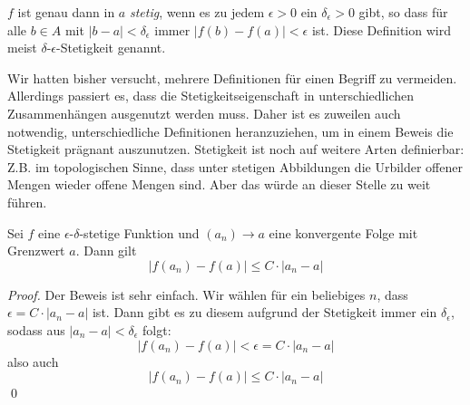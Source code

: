 \begin{definition}
$f$ ist genau dann in $a$ \textsl{stetig}, wenn es zu jedem $\epsilon>0$ ein $\delta_\epsilon > 0$ gibt, so dass für alle $b\in A$ mit $\vert b-a\vert < \delta_\epsilon $ immer $\vert f(b)-f(a)\vert < \epsilon$ ist. Diese Definition wird meist $\delta$-$\epsilon$-Stetigkeit genannt. 
\end{definition}

Wir hatten bisher versucht, mehrere Definitionen für einen Begriff zu vermeiden. Allerdings passiert es, dass die Stetigkeitseigenschaft in unterschiedlichen Zusammenhängen ausgenutzt werden muss. Daher ist es zuweilen auch notwendig, unterschiedliche Definitionen heranzuziehen, um in einem Beweis die Stetigkeit prägnant auszunutzen. Stetigkeit ist noch auf weitere Arten definierbar: Z.B. im topologischen Sinne, dass unter stetigen Abbildungen die Urbilder offener Mengen wieder offene Mengen sind. Aber das würde an dieser Stelle zu weit führen.

\begin{lemma}\label{lem:stetig}
Sei $f$ eine $\epsilon$-$\delta$-stetige Funktion und $(a_n) \rightarrow a$ eine konvergente Folge mit Grenzwert $a$. Dann gilt
\[
|f(a_n)-f(a)| \le C\cdot |a_n -a|
\]
\end{lemma}
\begin{proof}
Der Beweis ist sehr einfach. Wir wählen für ein beliebiges $n$, dass $\epsilon = C\cdot |a_n -a|$ ist. Dann gibt es zu diesem aufgrund der Stetigkeit immer ein $\delta_\epsilon$, sodass aus $|a_n-a|<\delta_\epsilon$ folgt:
\[
|f(a_n)-f(a)| < \epsilon = C\cdot |a_n -a|
\]
also auch
\[
|f(a_n)-f(a)| \le C\cdot |a_n -a|
\]
\qed
\end{proof}



